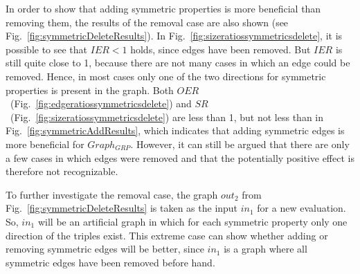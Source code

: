 In order to show that adding symmetric properties is more beneficial than removing them, the results of the removal case are also shown (see Fig.~\ref{fig:symmetricDeleteResults}). In Fig.~\ref{fig:sizeratiossymmetricsdelete}, it is possible to see that $IER<1$ holds, since edges have been removed. But $IER$ is still quite close to 1, because there are not many cases in which an edge could be removed. Hence, in most cases only one of the two directions for symmetric properties is present in the graph. Both $OER$~(Fig.~\ref{fig:edgeratiossymmetricsdelete}) and $SR$~(Fig.~\ref{fig:sizeratiossymmetricsdelete}) are less than 1, but not less than in Fig.~\ref{fig:symmetricAddResults}, which indicates that adding symmetric edges is more beneficial for $Graph_{GRP}$. However, it can still be argued that there are only a few cases in which edges were removed and that the potentially positive effect is therefore not recognizable.

To further investigate the removal case, the graph $out_2$ from Fig.~\ref{fig:symmetricDeleteResults} is taken as the input $in_1$ for a new evaluation. So, $in_1$ will be an artificial graph in which for each symmetric property only one direction of the triples exist. This extreme case can show whether adding or removing symmetric edges will be better, since $in_1$ is a graph where all symmetric edges have been removed before hand.

